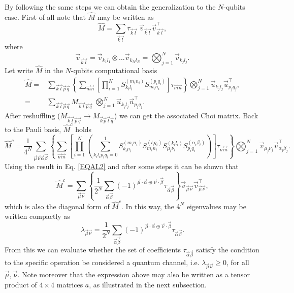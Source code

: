 \documentclass[11pt,dvipsnames]{article} %
\newcommand{\1}{\mathds{1}}
\begin{document}
By following the same steps we can obtain the generalization to the $N$-qubits case. First of all note that $\hat{M}$ may be written as
%
\begin{equation}
 \hat{M}=\sum_{\vec{k}\vec{l}}\tau_{\vec{k}\vec{l}}~\vec{v}_{\vec{k}\vec{l}}\vec{v}_{\vec{k}\vec{l}}^\intercal,
\end{equation}
% 
where
% 
\begin{equation}
 \vec{v}_{\vec{k}\vec{l}}=\vec{v}_{k_1l_1}\otimes\dots\vec{v}_{k_Nl_N}=\bigotimes_{j=1}^N\vec{v}_{k_jl_j}.
\end{equation}
% 
Let write $\hat{M}$ in the $N$-qubits computational basis
% 
\begin{align}
 \hat{M}=&\sum_{\vec{k}\vec{l}\vec{p}\vec{q}}\left\{\sum_{\vec{m}\vec{n}} \left[ \prod_{i=1}^N S_{k_il_i}^{(m_in_i)}S_{m_in_i}^{(p_iq_i)} \right] \tau_{\vec{m}\vec{n}} \right\} \bigotimes_{j=1}^N\vec{u}_{k_jl_j}\vec{u}_{p_jq_j}^\intercal,\\
 =&\sum_{\vec{k}\vec{l}\vec{p}\vec{q}} M_{\vec{k}\vec{l}\vec{p}\vec{q}} ~\bigotimes_{j=1}^N\vec{u}_{k_jl_j}\vec{u}_{p_jq_j}^\intercal.
\end{align}
% 
After reshuffling ($M_{\vec{k}\vec{l}\vec{p}\vec{q}}\to M_{\vec{k}\vec{p}\vec{l}\vec{q}}$) we can get the associated Choi matrix. Back to the Pauli basis, $\hat{M}^c$ holds
%
\begin{equation}
 \hat{M}^c=\frac{1}{4^N}\sum_{\vec{\mu}\vec{\nu}\vec{\alpha}\vec{\beta}}\left\{\sum_{\vec{m}\vec{n}}\left[\prod_{i=1}^N\left(\sum_{k_il_ip_iq_i=0}^1 S_{k_ip_i}^{(m_in_i)} S_{m_in_i}^{(l_iq_i)}S_{\mu_i\nu_i}^{(k_il_i)}S_{p_iq_i}^{(\alpha_i\beta_i)}\right)\right]\tau_{\vec{m}\vec{n}}\right\} \bigotimes_{j=1}^N\vec{v}_{\mu_j\nu_j}\vec{v}_{\alpha_j\beta_j}^\intercal.
\end{equation}
% 
Using the result in Eq. \ref{EQAL2} and after some steps it can be shown that
%
\begin{equation}
 \hat{M}^c=\sum_{\vec{\mu}\vec{\nu}}\left\{\frac{1}{2^N}\sum_{\vec{\alpha}\vec{\beta}}(-1)^{\vec{\mu}\cdot\vec{\alpha}\oplus \vec{\nu}\cdot\vec{\beta}}\tau_{\vec{\alpha}\vec{\beta}}\right\}\vec{v}_{\vec{\mu}\vec{\nu}}\vec{v}_{\vec{\mu}\vec{\nu}}^\intercal,
\end{equation}
% 
which is also the diagonal form of $\hat{M}^c$. In this way, the $4^N$ eigenvalues may be written compactly as
% 
\begin{equation}
 \lambda_{\vec{\mu}\vec{\nu}}=\frac{1}{2^N}\sum_{\vec{\alpha}\vec{\beta}}(-1)^{\vec{\mu}\cdot\vec{\alpha}\oplus \vec{\nu}\cdot\vec{\beta}}\tau_{\vec{\alpha}\vec{\beta}}.
\end{equation}
% 
From this we can evaluate whether the set of coefficients $\tau_{\vec{\alpha}\vec{\beta}}$ satisfy the condition to the specific operation be considered a quantum channel, i.e. $\lambda_{\vec{\mu}\vec{\nu}}\geq 0$, for all $\vec{\mu},\vec{\nu}$. Note moreover that the expression above may also be written as a tensor product of $4\times 4$ matrices $a$, as illustrated in the next subsection.
\end{document}
